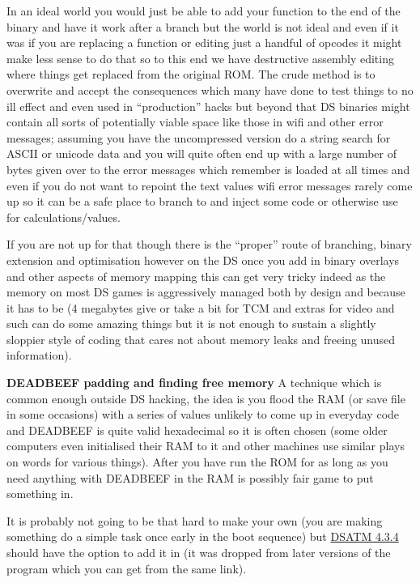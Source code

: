 \documentclass[
]{book}
\begin{document}
In an ideal world you would just be able to add your function to the end of the binary and have it work after a branch but the world is not ideal and even if it was if you are replacing a function or editing just a handful of opcodes it might make less sense to do that so to this end we have destructive assembly editing where things get replaced from the original ROM. The crude method is to overwrite and accept the consequences which many have done to test things to no ill effect and even used in ``production'' hacks but beyond that DS binaries might contain all sorts of potentially viable space like those in wifi and other error messages; assuming you have the uncompressed version do a string search for ASCII or unicode data and you will quite often end up with a large number of bytes given over to the error messages which remember is loaded at all times and even if you do not want to repoint the text values wifi error messages rarely come up so it can be a safe place to branch to and inject some code or otherwise use for calculations/values.

If you are not up for that though there is the ``proper'' route of branching, binary extension and optimisation however on the DS once you add in binary overlays and other aspects of memory mapping this can get very tricky indeed as the memory on most DS games is aggressively managed both by design and because it has to be (4 megabytes give or take a bit for TCM and extras for video and such can do some amazing things but it is not enough to sustain a slightly sloppier style of coding that cares not about memory leaks and freeing unused information).

\textbf{DEADBEEF padding and finding free memory} A technique which is common enough outside DS hacking, the idea is you flood the RAM (or save file in some occasions) with a series of values unlikely to come up in everyday code and DEADBEEF is quite valid hexadecimal so it is often chosen (some older computers even initialised their RAM to it and other machines use similar plays on words for various things). After you have run the ROM for as long as you need anything with DEADBEEF in the RAM is possibly fair game to put something in.

It is probably not going to be that hard to make your own (you are making something do a simple task once early in the boot sequence) but \href{http://filetrip.net/nds-downloads/utilities/download-dsatm-434-f27609.html\%20}{DSATM 4.3.4} should have the option to add it in (it was dropped from later versions of the program which you can get from the same link).
\end{document}
